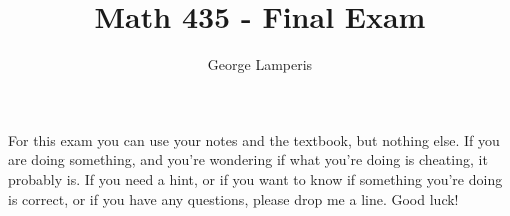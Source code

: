 \documentclass[letterpaper, 12pt, oneside]{memoir}
\title{Math 435 - Final Exam}
\author{George Lamperis}
\date{}
\theoremstyle{mystyle}
\begin{document}
\maketitle

For this exam you can use your notes and the textbook, but nothing else. If you
are doing something, and you're wondering if what you're doing is cheating, it
probably is. If you need a hint, or if you want to know if something you're
doing is correct, or if you have any questions, please drop me a line. Good luck!







\end{document}
